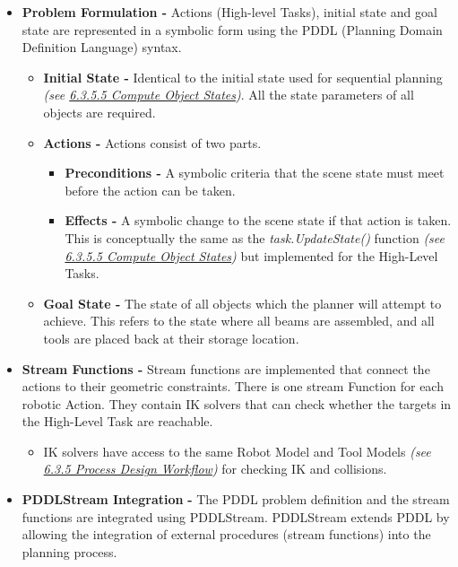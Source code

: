 \begin{itemize}
	\item \textbf{Problem Formulation - }Actions (High-level Tasks), initial state and goal state are represented in a symbolic form using the PDDL (Planning Domain Definition Language) syntax.

\begin{itemize}
	\item \textbf{Initial State - }Identical to the initial state used for sequential planning \textit{(see \ul{6.3.5.5 Compute Object States})}. All the state parameters of all objects are required.

	\item \textbf{Actions - }Actions consist of two parts. 

\begin{itemize}
	\item \textbf{Preconditions - }A symbolic criteria that the scene state must meet before the action can be taken. 

	\item \textbf{Effects - }A symbolic change to the scene state if that action is taken. This is conceptually the same as the \textit{task.UpdateState()} function \textit{(see \ul{6.3.5.5 Compute Object States})} but implemented for the High-Level Tasks.

\end{itemize}
	\item \textbf{Goal State - }The state of all objects which the planner will attempt to achieve. This refers to the state where all beams are assembled, and all tools are placed back at their storage location.

\end{itemize}
	\item \textbf{Stream Functions - }Stream functions are implemented that connect the actions to their geometric constraints. There is one stream Function for each robotic Action. They contain IK solvers that can check whether the targets in the High-Level Task are reachable.

\begin{itemize}
	\item IK solvers have access to the same Robot Model and Tool Models \textit{(see \ul{6.3.5 Process Design Workflow})} for checking IK and collisions.

\end{itemize}
	\item \textbf{PDDLStream Integration} \textbf{-} The PDDL problem definition and the stream functions are integrated using PDDLStream. PDDLStream extends PDDL by allowing the integration of external procedures (stream functions) into the planning process.


\end{itemize}
